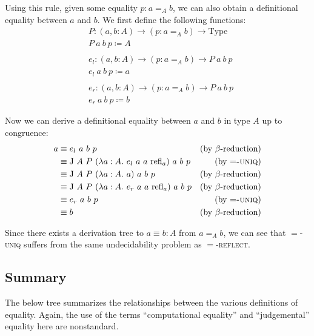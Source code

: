 \documentclass{report}
\newcommand{\const}[1]{\text{#1}}
\newcommand{\Type}{\const{Type}}
\newcommand{\refl}{\const{refl}}
\newcommand{\jelim}{\const{J}\xspace}
\newcommand{\refrule}[1]{\textsc{#1}}
\begin{document}
Using this rule, given some equality $p : a =_A b$, we can also obtain a definitional equality between $a$ and $b$. We first define the following functions:
%
\begin{align*}
    &P : (a, b : A) \to (p : a =_A b) \to \Type \\
    &P ~ a ~ b ~ p \coloneqq A \\
    \\
    &e_l :(a, b : A) \to (p : a =_A b) \to P ~ a ~ b ~ p \\
    &e_l ~ a ~ b ~ p \coloneqq a \\
    \\
    &e_r :(a, b : A) \to (p : a =_A b) \to P ~ a ~ b ~ p \\
    &e_r ~ a ~ b ~ p \coloneqq b
\end{align*}

Now we can derive a definitional equality between $a$ and $b$ in type $A$ up to congruence:
%
\begin{align*}
    a &\equiv e_l ~ a ~ b ~ p &(\text{by $\beta$-reduction}) \\
    &\equiv \jelim ~ A ~ P ~ (\lambda a : A. ~ e_l ~ a ~ a ~ \refl_a) ~ a ~ b ~ p &(\text{by \refrule{$=$-uniq}}) \\
    &\equiv \jelim ~ A ~ P ~ (\lambda a : A. ~ a) ~ a ~ b ~ p &(\text{by $\beta$-reduction}) \\
    &\equiv \jelim ~ A ~ P ~ (\lambda a : A. ~ e_r ~ a ~ a ~ \refl_a) ~ a ~ b ~ p &(\text{by $\beta$-reduction}) \\
    &\equiv e_r ~ a ~ b ~ p &(\text{by \refrule{$=$-uniq}}) \\
    &\equiv b &(\text{by $\beta$-reduction})
\end{align*}

Since there exists a derivation tree to $a \equiv b : A$ from $a =_A b$, we can see that \refrule{$=$-uniq} suffers from the same undecidability problem as \refrule{$=$-reflect}.

\subsection{Summary}

The below tree summarizes the relationships between the various definitions of equality. Again, the use of the terms ``computational equality'' and ``judgemental'' equality here are nonstandard.
\end{document}
